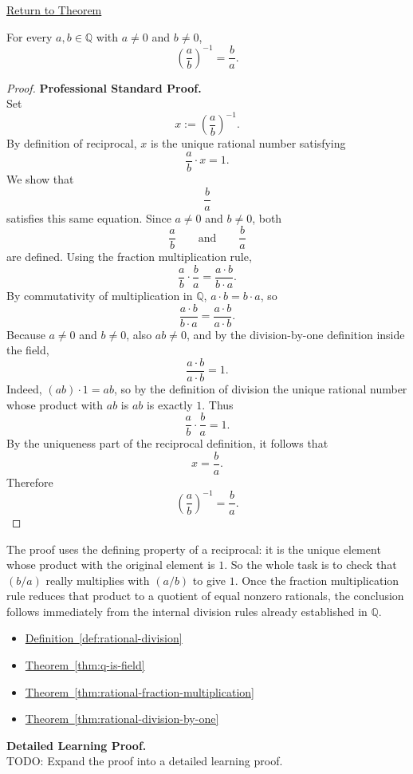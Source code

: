 \newpage
{}
\label{prf:rational-fraction-reciprocal}

\begin{remark*}[Return]
\hyperref[thm:rational-fraction-reciprocal]{Return to Theorem}
\end{remark*}

\begin{theorem*}
For every $a,b\in\mathbb{Q}$ with $a\neq 0$ and $b\neq 0$,
\[
\left(\frac{a}{b}\right)^{-1}=\frac{b}{a}.
\]
\end{theorem*}

\begin{proof}
\textbf{Professional Standard Proof.}~\\
Set
\[
x:=\left(\frac{a}{b}\right)^{-1}.
\]
By definition of reciprocal, $x$ is the unique rational number satisfying
\[
\frac{a}{b}\cdot x=1.
\]
We show that
\[
\frac{b}{a}
\]
satisfies this same equation.  Since $a\neq 0$ and $b\neq 0$, both
\[
\frac{a}{b}
\qquad\text{and}\qquad
\frac{b}{a}
\]
are defined.  Using the fraction multiplication rule,
\[
\frac{a}{b}\cdot\frac{b}{a}=\frac{a\cdot b}{b\cdot a}.
\]
By commutativity of multiplication in $\mathbb{Q}$, $a\cdot b=b\cdot a$, so
\[
\frac{a\cdot b}{b\cdot a}=\frac{a\cdot b}{a\cdot b}.
\]
Because $a\neq 0$ and $b\neq 0$, also $ab\neq 0$, and by the division-by-one
definition inside the field,
\[
\frac{a\cdot b}{a\cdot b}=1.
\]
Indeed, $(ab)\cdot 1=ab$, so by the definition of division the unique
rational number whose product with $ab$ is $ab$ is exactly $1$.
Thus
\[
\frac{a}{b}\cdot\frac{b}{a}=1.
\]
By the uniqueness part of the reciprocal definition, it follows that
\[
x=\frac{b}{a}.
\]
Therefore
\[
\left(\frac{a}{b}\right)^{-1}=\frac{b}{a}.
\]
\end{proof}

\begin{remark*}
The proof uses the defining property of a reciprocal: it is the unique
element whose product with the original element is $1$.  So the whole task is
to check that $(b/a)$ really multiplies with $(a/b)$ to give $1$.  Once the
fraction multiplication rule reduces that product to a quotient of equal
nonzero rationals, the conclusion follows immediately from the internal
division rules already established in $\mathbb{Q}$.
\end{remark*}

\begin{dependencies}
\begin{itemize}
  \item \hyperref[def:rational-division]{Definition~\ref*{def:rational-division}}
  \item \hyperref[thm:q-is-field]{Theorem~\ref*{thm:q-is-field}}
  \item \hyperref[thm:rational-fraction-multiplication]{Theorem~\ref*{thm:rational-fraction-multiplication}}
  \item \hyperref[thm:rational-division-by-one]{Theorem~\ref*{thm:rational-division-by-one}}
\end{itemize}
\end{dependencies}

\textbf{Detailed Learning Proof.}~\\
TODO: Expand the proof into a detailed learning proof.

